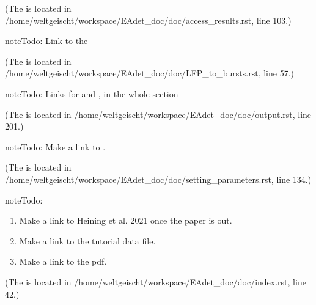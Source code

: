 \documentclass[letterpaper,10pt,english]{sphinxmanual}
\begin{document}
(The {\hyperref[\detokenize{access_results:index-0}]{}} is located in /home/weltgeischt/workspace/EAdet\_doc/doc/access\_results.rst, line 103.)

\begin{sphinxadmonition}{note}{Todo:}
Link to the 
\end{sphinxadmonition}

(The {\hyperref[\detokenize{LFP_to_bursts:index-0}]{}} is located in /home/weltgeischt/workspace/EAdet\_doc/doc/LFP\_to\_bursts.rst, line 57.)

\begin{sphinxadmonition}{note}{Todo:}
Links for  and , in the whole section
\end{sphinxadmonition}

(The {\hyperref[\detokenize{output:index-0}]{}} is located in /home/weltgeischt/workspace/EAdet\_doc/doc/output.rst, line 201.)

\begin{sphinxadmonition}{note}{Todo:}
Make a link to .
\end{sphinxadmonition}

(The {\hyperref[\detokenize{setting_parameters:index-0}]{}} is located in /home/weltgeischt/workspace/EAdet\_doc/doc/setting\_parameters.rst, line 134.)

\begin{sphinxadmonition}{note}{Todo:}\begin{enumerate}
\def\theenumi{\arabic{enumi}}
\def\labelenumi{\theenumi )}
\makeatletter\def\p@enumii{\p@enumi \theenumi )}\makeatother
\item {} 
Make a link to Heining et al. 2021 once the paper is out.

\item {} 
Make a link to the tutorial data file.

\item {} 
Make a link to the pdf.

\end{enumerate}
\end{sphinxadmonition}

(The {\hyperref[\detokenize{index:index-0}]{}} is located in /home/weltgeischt/workspace/EAdet\_doc/doc/index.rst, line 42.)



\renewcommand{\indexname}{Index}
\printindex
\end{document}
